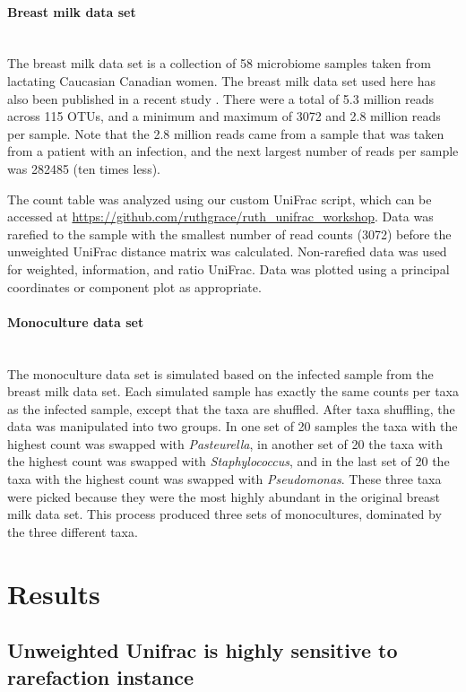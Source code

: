 \documentclass[10pt,letterpaper]{article}
\begin{document}
\paragraph{Breast milk data set}\mbox{}\\
The breast milk data set is a collection of 58 microbiome samples taken from lactating Caucasian Canadian women. The breast milk data set used here has also been published in a recent study \cite{urbaniak2016human}. There were a total of 5.3 million reads across 115 OTUs, and a minimum and maximum of 3072 and 2.8 million reads per sample. Note that the 2.8 million reads came from a sample that was taken from a patient with an infection, and the next largest number of reads per sample was 282485 (ten times less).

The count table was analyzed using our custom UniFrac script, which can be accessed at \url{https://github.com/ruthgrace/ruth_unifrac_workshop}. Data was rarefied to the sample with the smallest number of read counts (3072) before the unweighted UniFrac distance matrix was calculated. Non-rarefied data was used for weighted, information, and ratio UniFrac. Data was plotted using a principal coordinates or component plot as appropriate.

\paragraph{Monoculture data set}\mbox{}\\
The monoculture data set is simulated based on the infected sample from the breast milk data set. Each simulated sample has exactly the same counts per taxa as the infected sample, except that the taxa are shuffled. After taxa shuffling, the data was manipulated into two groups. In one set of 20 samples the taxa with the highest count was swapped with \textit{Pasteurella}, in another set of 20 the taxa with the highest count was swapped with \textit{Staphylococcus}, and in the last set of 20 the taxa with the highest count was swapped with \textit{Pseudomonas}. These three taxa were picked because they were the most highly abundant in the original breast milk data set. This process produced three sets of monocultures, dominated by the three different taxa.

\section*{Results}

\subsection{Unweighted Unifrac is highly sensitive to rarefaction instance}
\end{document}
